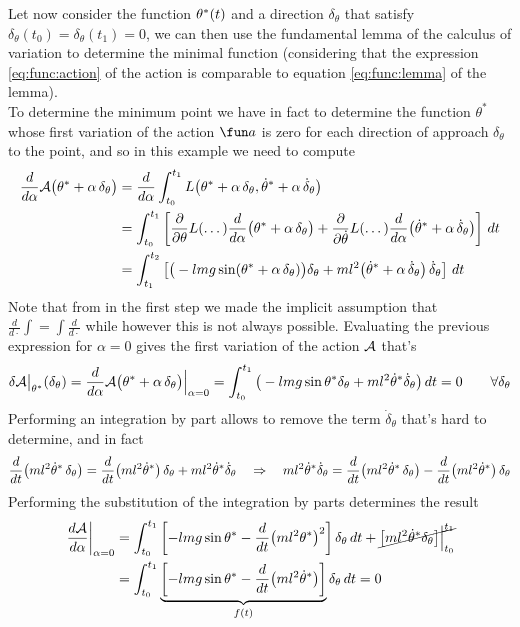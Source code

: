 Let now consider the function $\theta^*(t)$ and a direction $\delta_\theta$ that satisfy $\delta_\theta(t_0)=\delta_\theta(t_1) = 0$, we can then use the fundamental lemma of the calculus of variation to determine the minimal function (considering that the expression \ref{eq:func:action} of the action is comparable to equation \ref{eq:func:lemma} of the lemma).\\
To determine the minimum point we have in fact to determine the function $\theta^*$ whose first variation of the action $\fun a$ is zero for each direction of approach $\delta_\theta$ to the point, and so in this example we need to compute
\begin{align*}
	\frac{d}{d\alpha} \mathcal A\big(\theta^* + \alpha\, \delta_\theta\big) & = \frac{d}{d\alpha}\int_{t_0}^{t_1} L  \big( \theta ^* + \alpha\, \delta_\theta, \dot\theta^* + \alpha\, \dot \delta_\theta \big) \\
	& = \int_{t_0}^{t_1} \left[\frac{\partial }{\partial \theta} L ( \dots ) \frac{d}{d\alpha}\big(\theta^* + \alpha \,\delta_\theta\big) +\frac{\partial }{\partial \dot\theta} L  (\dots) \frac{d}{d\alpha}\big(\dot \theta^* + \alpha \,\dot \delta_\theta\big) \right]\, dt \\
	& = \int_{t_1}^{t_2} \left[ \big(-lmg\sin(\theta^* + \alpha\, \delta_\theta)\big)\delta_\theta + ml^2\big(
	\dot\theta^* + \alpha \, \dot\delta_\theta \big)\, \dot\delta_\theta \right] \, dt
\end{align*}
Note that from in the first step we made the implicit assumption that $ \frac d{d\cdot} \int = \int\frac{d}{d\cdot}$ while however this is not always possible. Evaluating the previous expression for $\alpha = 0$ gives the first variation of the action $\mathcal{A}$ that's
\[  \delta \mathcal{A} \big|_{\theta^*}(\delta_\theta) = \frac{d}{d\alpha} \mathcal A\big(\theta^* + \alpha\, \delta_\theta\big) \Big|_{\alpha = 0} = \int_{t_0}^{t_1} \big(-lmg \sin\theta^*\delta_\theta + ml^2\dot\theta^* \dot\delta_\theta \big) \, dt = 0 \qquad \forall \delta_\theta \]
Performing an integration by part allows to remove the term $\dot\delta_\theta$ that's hard to determine, and in fact
\[ \frac{d}{dt}\big( ml^2\dot\theta^* \, \delta_\theta\big) = \frac{d}{dt}\big(ml^2\dot\theta^*\big)\,\delta_\theta + ml^2\dot\theta^* \dot\delta_\theta \quad \Rightarrow \quad ml^2\dot\theta^* \dot\delta_\theta = \frac{d}{dt}\big( ml^2\dot\theta^* \, \delta_\theta\big) - \frac{d}{dt}\big(ml^2\dot\theta^*\big)\,\delta_\theta \]
Performing the substitution of the integration by parts determines the result
\begin{align*}
	\left. \frac{d\mathcal A}{d\alpha}\right|_{\alpha = 0} & = \int_{t_0}^{t_1}  \left[ - lmg\sin\theta^* - \frac d{dt}\big(ml^2\theta^*\big)^2 \right]\delta_\theta\, dt + \cancel{\big[ ml^2 \dot\theta^* \delta_\theta \big]\Big|_{t_0}^{t_1} } \\
	& = \int_{t_0}^{t_1} \underbrace{\left[ -lmg \sin\theta^* - \frac d{dt}\big(ml^2 \dot\theta^*\big) \right]}_{f(t)} \delta_\theta\, dt = 0
\end{align*}
